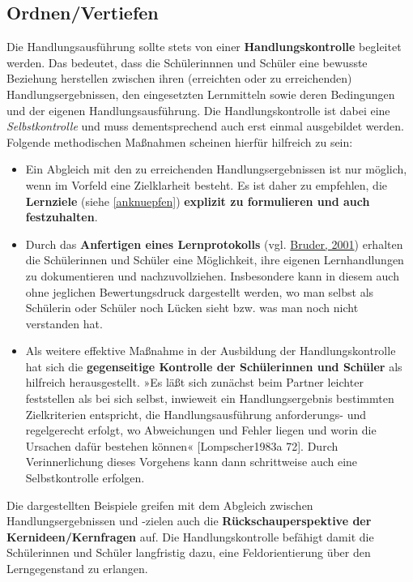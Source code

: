 \documentclass[
]{scrbook}
\theoremstyle{definition}
\theoremstyle{definition}
\theoremstyle{definition}
\theoremstyle{definition}
\theoremstyle{remark}
\begin{document}
\hypertarget{ordnenvertiefen}{%
\subsection{Ordnen/Vertiefen}\label{ordnenvertiefen}}

Die Handlungsausführung sollte stets von einer \textbf{Handlungskontrolle} begleitet werden. Das bedeutet, dass die Schülerinnnen und Schüler eine bewusste Beziehung herstellen zwischen ihren (erreichten oder zu erreichenden) Handlungsergebnissen, den eingesetzten Lernmitteln sowie deren Bedingungen und der eigenen Handlungsausführung.
Die Handlungskontrolle ist dabei eine \emph{Selbstkontrolle} und muss dementsprechend auch erst einmal ausgebildet werden. Folgende methodischen Maßnahmen scheinen hierfür hilfreich zu sein:

\begin{itemize}
\item
  Ein Abgleich mit den zu erreichenden Handlungsergebnissen ist nur möglich, wenn im Vorfeld eine Zielklarheit besteht. Es ist daher zu empfehlen, die \textbf{Lernziele} (siehe \ref{anknuepfen}) \textbf{explizit zu formulieren und auch festzuhalten}.
\item
  Durch das \textbf{Anfertigen eines Lernprotokolls} (vgl. \protect\hyperlink{ref-Bruder2011}{Bruder, 2001}) erhalten die Schülerinnen und Schüler eine Möglichkeit, ihre eigenen Lernhandlungen zu dokumentieren und nachzuvollziehen. Insbesondere kann in diesem auch ohne jeglichen Bewertungsdruck dargestellt werden, wo man selbst als Schülerin oder Schüler noch Lücken sieht bzw. was man noch nicht verstanden hat.
\item
  Als weitere effektive Maßnahme in der Ausbildung der Handlungskontrolle hat sich die \textbf{gegenseitige Kontrolle der Schülerinnen und Schüler} als hilfreich herausgestellt. »Es läßt sich zunächst beim Partner leichter feststellen als bei sich selbst, inwieweit ein Handlungsergebnis bestimmten Zielkriterien entspricht, die Handlungsausführung anforderungs- und regelgerecht erfolgt, wo Abweichungen und Fehler liegen und worin die Ursachen dafür bestehen können« {[}Lompscher1983a 72{]}. Durch Verinnerlichung dieses Vorgehens kann dann schrittweise auch eine Selbstkontrolle erfolgen.
\end{itemize}

Die dargestellten Beispiele greifen mit dem Abgleich zwischen Handlungsergebnissen und -zielen auch die \textbf{Rückschauperspektive der Kernideen/Kernfragen} auf. Die Handlungskontrolle befähigt damit die Schülerinnen und Schüler langfristig dazu, eine Feldorientierung über den Lerngegenstand zu erlangen.
\end{document}
